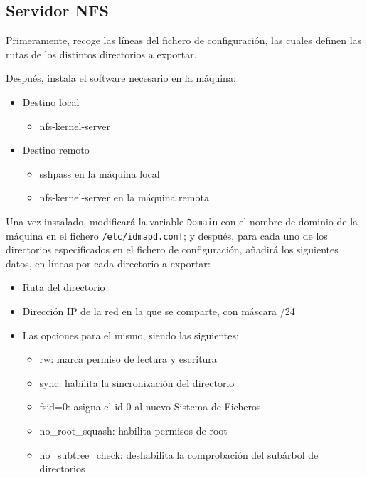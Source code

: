 \subsection{Servidor NFS}
Primeramente, recoge las líneas del fichero de configuración, las cuales definen las rutas de los distintos directorios a exportar.

Después, instala el software necesario en la máquina:
\begin{itemize}
    \item Destino local
    \begin{itemize}
        \item nfs-kernel-server
    \end{itemize}
    \item Destino remoto
    \begin{itemize}
        \item sshpass en la máquina local
        \item nfs-kernel-server en la máquina remota
    \end{itemize}
\end{itemize}

Una vez instalado, modificará la variable \texttt{Domain} con el nombre de dominio de la máquina en el fichero \texttt{/etc/idmapd.conf}; y después, para cada uno de los directorios especificados en el fichero de configuración, añadirá los siguientes datos, en líneas por cada directorio a exportar\cite{nfsserver}:

\begin{itemize}
    \item Ruta del directorio
    \item Dirección IP de la red en la que se comparte, con máscara /24
    \item Las opciones para el mismo, siendo las siguientes:
    \begin{itemize}
        \item rw: marca permiso de lectura y escritura
        \item sync: habilita la sincronización del directorio
        \item fsid=0: asigna el id 0 al nuevo Sistema de Ficheros
        \item no\_root\_squash: habilita permisos de root
        \item no\_subtree\_check: deshabilita la comprobación del subárbol de directorios
    \end{itemize}
\end{itemize}

